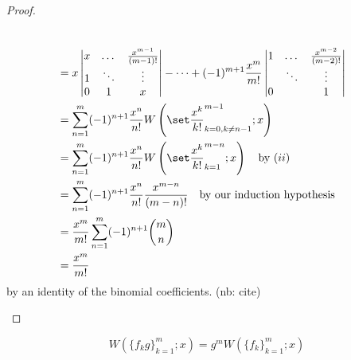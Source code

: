 \documentclass{book}
\begin{document}
\begin{proof}
\begin{description}
\begin{align*}
\\
& = x \begin{vmatrix} x & \dots & \poly{m-1} \\ 1 & \ddots & \vdots \\ 0 & 1 & x \end{vmatrix} - \dots + (-1)^{m+1} \Poly{m} \begin{vmatrix} 1 & \dots & \poly{m-2} \\  & \ddots & \vdots \\ 0 &  & 1 \end{vmatrix} \\
& = \sum_{n=1}^m (-1)^{n+1} \Poly{n} \Wpoly{k=0,k \neq n-1}{m-1} \\
& = \sum_{n=1}^m (-1)^{n+1} \Poly{n} \Wpoly{k=1}{m-n} \quad \text{by $(ii)$} \\
& = \sum_{n=1}^m (-1)^{n+1} \Poly{n} \poly{m-n} \quad \text{by our induction hypothesis} \\
& = \Poly{m} \sum_{n=1}^m (-1)^{n+1} \binom{m}{n} \\
& = \Poly{m}
\end{align*}
by an identity of the binomial coefficients. (nb: cite)
\end{description}
\end{proof}

\begin{lemma}
\begin{equation*}
W(\{ f_k g \}_{k=1}^m ; x) = g^m W(\{ f_k \}_{k=1}^m ; x )
\end{equation*}
\label{lem:group}
\end{lemma}
\end{document}
